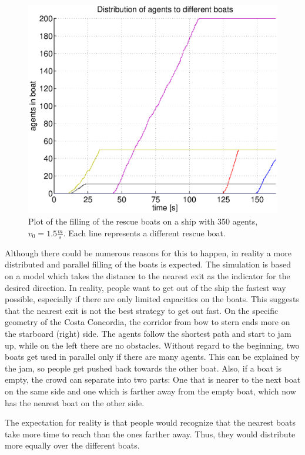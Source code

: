 \documentclass[11pt]{article}
\begin{document}
\begin{figure}[h]
	\centering
	\includegraphics[scale=0.5]{images/distribution33.eps}
    \caption{Plot of the filling of the rescue boats on a ship with 350 agents,
    \(v_0=1.5\frac{m}{s}\).
	Each line represents a different rescue boat.}
	\label{distribution33}
\end{figure}

Although there could be numerous reasons for this to happen, in reality a more
distributed and parallel filling of the boats is expected.  The simulation is
based on a model which takes the distance to the nearest exit as the indicator
for the desired direction.  In reality, people want to get out of the ship the
fastest way possible, especially if there are only limited capacities on the
boats.  This suggests that the nearest exit is not the best strategy to get out
fast.  On the specific geometry of the Costa Concordia, the corridor from bow
to stern ends more on the starboard (right) side.  The agents follow the
shortest path and start to jam up, while on the left there are no obstacles.
Without regard to the beginning, two boats get used in parallel only if there
are many agents.  This can be explained by the jam, so people get pushed back
towards the other boat. Also, if a boat is empty, the crowd can separate into
two parts: One that is nearer to the next boat on the same side and one which
is farther away from the empty boat, which now has the nearest boat on the
other side.

The expectation for reality is that people would recognize that the nearest 
boats take more time to reach than the ones farther away. Thus, they would 
distribute more equally over the different boats.
\end{document}
